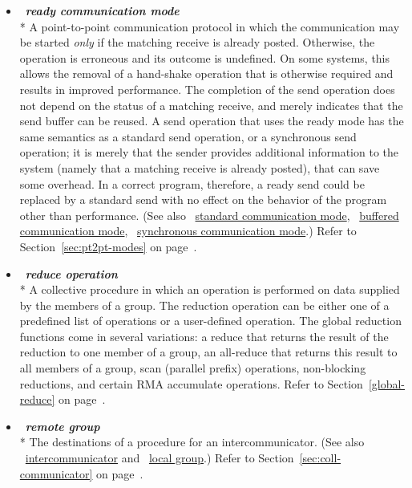 \begin{itemize}
\label{glossary:ready_communication_mode}
\item  ~\hypertarget{glossary:ready_communication_mode}{\emph{\textbf{ready communication mode}}} \\*
A point-to-point communication protocol in which the communication
may be started {\em only} if the matching receive is already posted.
Otherwise, the operation is erroneous and its outcome is undefined.
On some systems, this allows the removal of a hand-shake
operation that is otherwise required and results in improved
performance.
The completion of the send operation does not depend on the
status of a matching receive, and merely indicates that the send
buffer can be reused.   A send operation that uses the ready mode has
the same semantics as a standard send operation, or a synchronous send
operation; it is merely that the sender provides additional
information to the system (namely that a matching receive is already
posted), that can save some overhead.  In a correct program, therefore, a
ready send could be replaced by a standard send with no effect on the
behavior of the program other than performance.
(See also ~\hyperlink{glossary:standard_communication_mode}{standard communication mode}, 
~\hyperlink{glossary:buffered_communication_mode}{buffered communication mode},
~\hyperlink{glossary:synchronous_communication_mode}{synchronous communication mode}.)
Refer to Section~\ref{sec:pt2pt-modes} on page~\pageref{sec:pt2pt-modes}.

\label{glossary:reduce_operation}
\item  ~\hypertarget{glossary:reduce_operation}{\emph{\textbf{reduce operation}}} \\*
A collective procedure in which an operation is performed on data supplied by the members of a group.
The reduction operation can be either one of a predefined list of
operations or a user-defined operation.
The global reduction functions come in several variations: a reduce that
returns the result of the reduction
to one member of a group,
an all-reduce that
returns this result
to all members of a group,
scan (parallel prefix) operations,
non-blocking reductions,
and certain RMA accumulate operations.  
Refer to Section~\ref{global-reduce} on page~\pageref{global-reduce}.

\label{glossary:remote_group}
\item  ~\hypertarget{glossary:remote_group}{\emph{\textbf{remote group}}} \\*
The destinations of a procedure for an intercommunicator. 
(See also ~\hyperlink{glossary:intercommunicator}{intercommunicator} and
~\hyperlink{glossary:local_group}{local group}.)
Refer to Section~\ref{sec:coll-communicator} on page~\pageref{sec:coll-communicator}.


\end{itemize}
